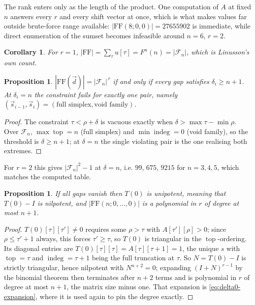 \documentclass[11pt, a4paper, abstract=yes]{scrartcl}
\theoremstyle{definition}
\theoremstyle{remark}
\theoremstyle{plain}
\newtheorem{proposition}[definition]{Proposition}
\newtheorem{corollary}[definition]{Corollary}
\newcommand{\indeg}{\operatorname{indeg}}
\newcommand{\tp}{\operatorname{top}}
\begin{document}
The rank enters only as the length of the product. One computation of \(A\) at fixed \(n\) answers
every \(r\) and every shift vector at once, which is what makes values far outside brute-force range
available: \(|\mathrm{FF}(8;0,0)|=27655902\) is immediate, while direct enumeration of the sumset
becomes infeasible around \(n=6\), \(r=2\).

\begin{corollary}
For \(r=1\), \(|\mathrm{FF}|=\sum_\tau u[\tau]=F^n(n)=|\mathcal F_n|\), which is Linusson's own count.
\label{cor-r1}
\end{corollary}

\begin{proposition}
\(|\mathrm{FF}(\vec d)|=|\mathcal F_n|^{\,r}\) if and only if every gap satisfies \(\delta_i\ge n+1\).
At \(\delta_i=n\) the constraint fails for exactly one pair, namely
\((\vec s_{i-1},\vec s_i)=(\text{full simplex},\text{void family})\).
\label{prop-threshold}
\end{proposition}

\begin{proof}
The constraint \(\tau<\rho+\delta\) is vacuous exactly when \(\delta>\max\tau-\min\rho\). Over
\(\mathcal F_n\), \(\max\tp=n\) (full simplex) and \(\min\indeg=0\) (void family), so the threshold is
\(\delta\ge n+1\); at \(\delta=n\) the single violating pair is the one realising both extremes.
\end{proof}

For \(r=2\) this gives \(|\mathcal F_n|^2-1\) at \(\delta=n\), i.e. \(99\), \(675\), \(9215\) for
\(n=3,4,5\), which matches the computed table.

\begin{proposition}
If all gaps vanish then \(T(0)\) is unipotent, meaning that \(T(0)-I\) is nilpotent, and
\(|\mathrm{FF}(n;0,\dots,0)|\) is a polynomial in
\(r\) of degree at most \(n+1\).
\label{prop-delta0}
\end{proposition}

\begin{proof}
\(T(0)[\tau][\tau']\ne0\) requires some \(\rho>\tau\) with \(A[\tau'][\rho]>0\); since
\(\rho\le\tau'+1\) always, this forces \(\tau'\ge\tau\), so \(T(0)\) is triangular in the
\(\tp\)-ordering. Its diagonal entries are \(T(0)[\tau][\tau]=A[\tau][\tau+1]=1\), the unique
\(s\) with \(\tp=\tau\) and \(\indeg=\tau+1\) being the full truncation at \(\tau\). So
\(N=T(0)-I\) is strictly triangular, hence nilpotent with \(N^{n+2}=0\); expanding
\((I+N)^{r-1}\) by the binomial theorem then terminates after \(n+2\) terms and is polynomial in
\(r\) of degree at most \(n+1\), the matrix size minus one. That expansion is
\eqref{eq:delta0-expansion}, where it is used again to pin the degree exactly.
\end{proof}
\end{document}
